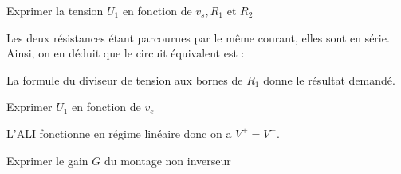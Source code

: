 


\begin{enonce}
  Exprimer la tension \(U_{1}\) en fonction de \(v_{s}, R_{1}\) et \(R_{2}\)
\end{enonce}


\begin{corrigeNewpage}
  Les deux résistances étant parcourues par le même courant, elles sont en série. Ainsi, on en déduit que le circuit équivalent est : \minusBigskip
  \begin{center}
    \shorthandoff{!:}
    \shorthandon{!:}
  \end{center}
  \minusMedskip
  La formule du diviseur de tension aux bornes de \(R_{1}\) donne le résultat demandé.
\end{corrigeNewpage}




\begin{enonce}
  Exprimer \(U_{1}\) en fonction de \(v_{e}\)
\end{enonce}


\begin{corrige}
  L’ALI fonctionne en régime linéaire donc on a \(V^{+} = V^{-}\).
\end{corrige}




\begin{enonce}
  Exprimer le gain \(G\) du montage non inverseur
\end{enonce}

